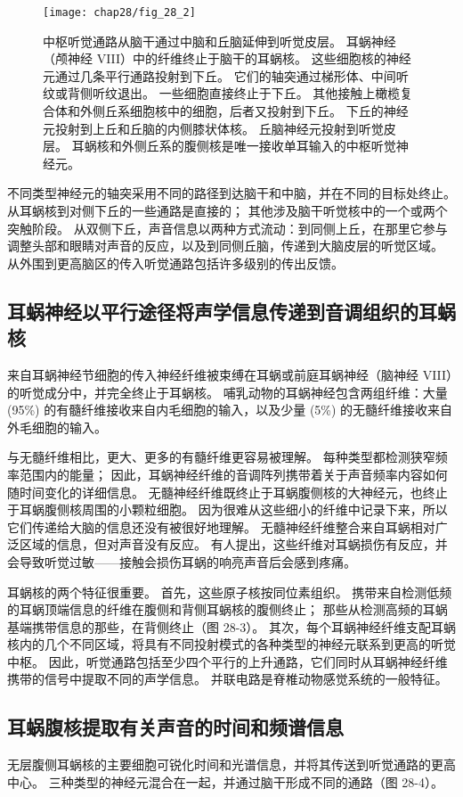 \begin{figure}[htbp]
	\centering
	\texttt{[image: chap28/fig\_28\_2]}
	\caption*{中枢听觉通路从脑干通过中脑和丘脑延伸到听觉皮层。 耳蜗神经（颅神经 VIII）中的纤维终止于脑干的耳蜗核。 这些细胞核的神经元通过几条平行通路投射到下丘。 它们的轴突通过梯形体、中间听纹或背侧听纹退出。 一些细胞直接终止于下丘。 其他接触上橄榄复合体和外侧丘系细胞核中的细胞，后者又投射到下丘。 下丘的神经元投射到上丘和丘脑的内侧膝状体核。 丘脑神经元投射到听觉皮层。 耳蜗核和外侧丘系的腹侧核是唯一接收单耳输入的中枢听觉神经元。}
	\label{auditory_pathways}
\end{figure}

不同类型神经元的轴突采用不同的路径到达脑干和中脑，并在不同的目标处终止。 从耳蜗核到对侧下丘的一些通路是直接的； 其他涉及脑干听觉核中的一个或两个突触阶段。 从双侧下丘，声音信息以两种方式流动：到同侧上丘，在那里它参与调整头部和眼睛对声音的反应，以及到同侧丘脑，传递到大脑皮层的听觉区域。 从外围到更高脑区的传入听觉通路包括许多级别的传出反馈。

\subsection{耳蜗神经以平行途径将声学信息传递到音调组织的耳蜗核}
来自耳蜗神经节细胞的传入神经纤维被束缚在耳蜗或前庭耳蜗神经（脑神经 VIII）的听觉成分中，并完全终止于耳蜗核。 哺乳动物的耳蜗神经包含两组纤维：大量 (95\%) 的有髓纤维接收来自内毛细胞的输入，以及少量 (5\%) 的无髓纤维接收来自外毛细胞的输入。

与无髓纤维相比，更大、更多的有髓纤维更容易被理解。 每种类型都检测狭窄频率范围内的能量； 因此，耳蜗神经纤维的音调阵列携带着关于声音频率内容如何随时间变化的详细信息。 无髓神经纤维既终止于耳蜗腹侧核的大神经元，也终止于耳蜗腹侧核周围的小颗粒细胞。 因为很难从这些细小的纤维中记录下来，所以它们传递给大脑的信息还没有被很好地理解。 无髓神经纤维整合来自耳蜗相对广泛区域的信息，但对声音没有反应。 有人提出，这些纤维对耳蜗损伤有反应，并会导致听觉过敏——接触会损伤耳蜗的响亮声音后会感到疼痛。

耳蜗核的两个特征很重要。 首先，这些原子核按同位素组织。 携带来自检测低频的耳蜗顶端信息的纤维在腹侧和背侧耳蜗核的腹侧终止； 那些从检测高频的耳蜗基端携带信息的那些，在背侧终止（图 28-3）。 其次，每个耳蜗神经纤维支配耳蜗核内的几个不同区域，将具有不同投射模式的各种类型的神经元联系到更高的听觉中枢。 因此，听觉通路包括至少四个平行的上升通路，它们同时从耳蜗神经纤维携带的信号中提取不同的声学信息。 并联电路是脊椎动物感觉系统的一般特征。



\subsection{耳蜗腹核提取有关声音的时间和频谱信息}
无层腹侧耳蜗核的主要细胞可锐化时间和光谱信息，并将其传送到听觉通路的更高中心。 三种类型的神经元混合在一起，并通过脑干形成不同的通路（图 28-4）。


